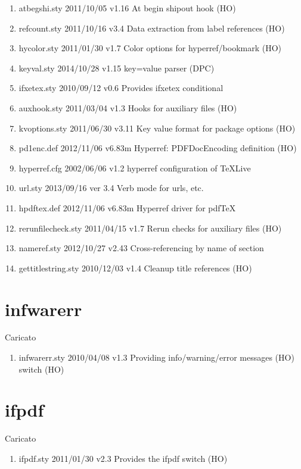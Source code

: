 \begin{enumerate}
\item 	atbegshi.sty    2011/10/05 v1.16 At begin shipout hook (HO)
\item 	refcount.sty    2011/10/16 v3.4 Data extraction from label references (HO)
\item 	hycolor.sty    2011/01/30 v1.7 Color options for hyperref/bookmark (HO)
\item 	keyval.sty    2014/10/28 v1.15 key=value parser (DPC)
\item 	ifxetex.sty    2010/09/12 v0.6 Provides ifxetex conditional
\item 	auxhook.sty    2011/03/04 v1.3 Hooks for auxiliary files (HO)
\item 	kvoptions.sty    2011/06/30 v3.11 Key value format for package options (HO)
\item 	pd1enc.def    2012/11/06 v6.83m Hyperref: PDFDocEncoding definition (HO)
\item 	hyperref.cfg    2002/06/06 v1.2 hyperref configuration of TeXLive
\item 	url.sty    2013/09/16  ver 3.4  Verb mode for urls, etc.
\item 	hpdftex.def    2012/11/06 v6.83m Hyperref driver for pdfTeX
\item 	rerunfilecheck.sty    2011/04/15 v1.7 Rerun checks for auxiliary files (HO)
\item 	nameref.sty    2012/10/27 v2.43 Cross-referencing by name of section
\item 	gettitlestring.sty    2010/12/03 v1.4 Cleanup title references (HO)
\end{enumerate} 
\section{infwarerr}  


Caricato 
\begin{enumerate}
	\item infwarerr.sty 2010/04/08 v1.3 Providing info/warning/error messages (HO) switch (HO)
\end{enumerate} 
\section{ifpdf}  


Caricato 
\begin{enumerate}
\item ifpdf.sty 2011/01/30 v2.3 Provides the ifpdf switch (HO)
\end{enumerate} 
